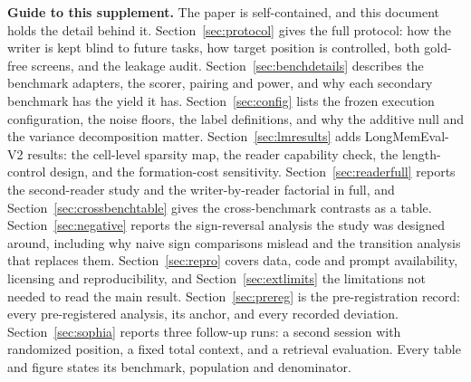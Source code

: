 \noindent\textbf{Guide to this supplement.}
The paper is self-contained, and this document holds the detail behind it. Section~\ref{sec:protocol} gives the full protocol: how the
writer is kept blind to future tasks, how target position is controlled,
both gold-free screens, and the leakage audit.
Section~\ref{sec:benchdetails} describes the benchmark adapters, the scorer,
pairing and power, and why each secondary benchmark has the yield it has.
Section~\ref{sec:config} lists the frozen execution configuration, the noise
floors, the label definitions, and why the additive null and the variance
decomposition matter. Section~\ref{sec:lmresults} adds LongMemEval-V2
results: the cell-level sparsity map, the reader capability check, the
length-control design, and the formation-cost sensitivity. Section~\ref{sec:readerfull} reports the
second-reader study and the writer-by-reader factorial in full, and
Section~\ref{sec:crossbenchtable} gives the cross-benchmark contrasts as a
table. Section~\ref{sec:negative} reports the sign-reversal analysis the study
was designed around, including why naive sign comparisons mislead and the
transition analysis that replaces them. Section~\ref{sec:repro} covers data, code and
prompt availability, licensing and reproducibility, and
Section~\ref{sec:extlimits} the limitations not needed to read the main result. Section~\ref{sec:prereg} is the pre-registration record: every
pre-registered analysis, its anchor, and every recorded deviation. Section~\ref{sec:sophia} reports three follow-up runs: a second session
with randomized position, a fixed total context, and a retrieval evaluation. Every table and figure states its
benchmark, population and denominator.
